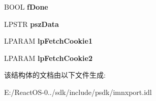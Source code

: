 \begin{DoxyCompactItemize}
B\+O\+OL {\bfseries f\+Done}
\item 
\mbox{\label{struct_i_i_m_a_p_callback_1_1tag_f_e_t_c_h___b_o_d_y___p_a_r_t_a92816e2839c0222e5f52cfcc7f7c7d00}} 
L\+P\+S\+TR {\bfseries psz\+Data}
\item 
\mbox{\label{struct_i_i_m_a_p_callback_1_1tag_f_e_t_c_h___b_o_d_y___p_a_r_t_ade98c1f8985b4a7a7f3f4fe49c4abe71}} 
L\+P\+A\+R\+AM {\bfseries lp\+Fetch\+Cookie1}
\item 
\mbox{\label{struct_i_i_m_a_p_callback_1_1tag_f_e_t_c_h___b_o_d_y___p_a_r_t_ab0bf069b16ca39a98b0e497902d02bfe}} 
L\+P\+A\+R\+AM {\bfseries lp\+Fetch\+Cookie2}
\end{DoxyCompactItemize}


该结构体的文档由以下文件生成\+:\begin{DoxyCompactItemize}
\item 
E\+:/\+React\+O\+S-\/0../sdk/include/psdk/imnxport.\+idl\end{DoxyCompactItemize}
